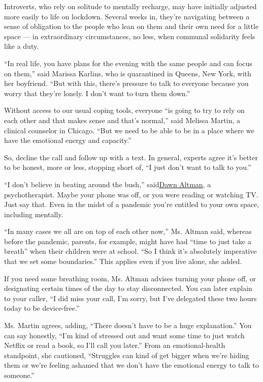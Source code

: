 Introverts, who rely on solitude to mentally recharge, may have
initially adjusted more easily to life on lockdown. Several weeks in,
they're navigating between a sense of obligation to the people who lean
on them and their own need for a little space --- in extraordinary
circumstances, no less, when communal solidarity feels like a duty.

``In real life, you have plans for the evening with the same people and
can focus on them,'' said Marissa Karlins, who is quarantined in Queens,
New York, with her boyfriend. ``But with this, there's pressure to talk
to everyone because you worry that they're lonely. I don't want to turn
them down.''

Without access to our usual coping tools, everyone ``is going to try to
rely on each other and that makes sense and that's normal,'' said
Melissa Martin, a clinical counselor in Chicago. ``But we need to be
able to be in a place where we have the emotional energy and capacity.''

So, decline the call and follow up with a text. In general, experts
agree it's better to be honest, more or less, stopping short of, ``I
just don't want to talk to you.''

``I don't believe in beating around the bush,''
said\href{https://dawnaltman.com/}{Dawn Altman}, a psychotherapist.
Maybe your phone was off, or you were reading or watching TV. Just say
that. Even in the midst of a pandemic you're entitled to your own space,
including mentally.

``In many cases we all are on top of each other now,'' Ms. Altman said,
whereas before the pandemic, parents, for example, might have had ``time
to just take a breath'' when their children were at school. ``So I think
it's absolutely imperative that we set some boundaries.'' This applies
even if you live alone, she added.

If you need some breathing room, Ms. Altman advises turning your phone
off, or designating certain times of the day to stay disconnected. You
can later explain to your caller, ``I did miss your call, I'm sorry, but
I've delegated these two hours today to be device-free.''

Ms. Martin agrees, adding, ``There doesn't have to be a huge
explanation.'' You can say honestly, ``I'm kind of stressed out and want
some time to just watch Netflix or read a book, so I'll call you
later.'' From an emotional-health standpoint, she cautioned, ``Struggles
can kind of get bigger when we're hiding them or we're feeling ashamed
that we don't have the emotional energy to talk to someone.''

